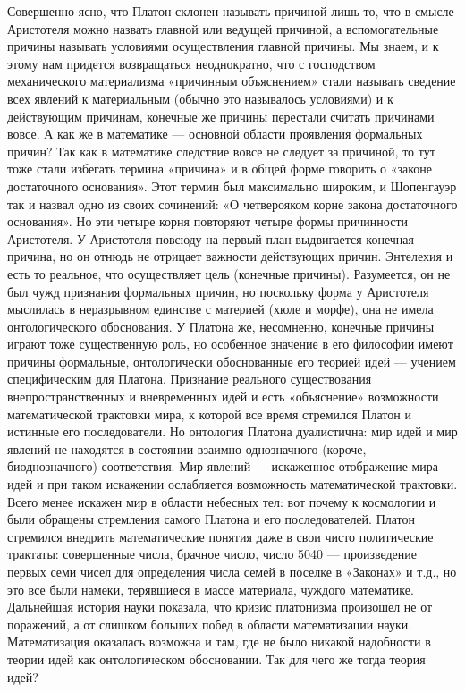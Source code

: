 Совершенно ясно,  что Платон  склонен называть  причиной лишь  то, что
в  смысле  Аристотеля  можно  назвать главной  или  ведущей  причиной,
а  вспомогательные причины  называть  условиями осуществления  главной
причины. Мы знаем,  и к этому нам  придется возвращаться неоднократно,
что с  господством механического материализма  «причинным объяснением»
стали  называть  сведение  всех  явлений к  материальным  (обычно  это
называлось условиями)  и к  действующим причинам, конечные  же причины
перестали считать причинами вовсе. А  как же в математике --- основной
области проявления  формальных причин? Так как  в математике следствие
вовсе  не следует  за причиной,  то  тут тоже  стали избегать  термина
«причина» и в общей форме  говорить о «законе достаточного основания».
Этот термин был максимально широким, и Шопенгауэр так и назвал одно из
своих сочинений: «О четверояком  корне закона достаточного основания».
Но эти четыре  корня повторяют четыре формы  причинности Аристотеля. У
Аристотеля повсюду на первый план  выдвигается конечная причина, но он
отнюдь не  отрицает важности действующих  причин. Энтелехия и  есть то
реальное, что осуществляет цель  (конечные причины). Разумеется, он не
был чужд признания формальных причин,  но поскольку форма у Аристотеля
мыслилась в  неразрывном единстве  с материей (хюле  и морфе),  она не
имела онтологического обоснования. У  Платона же, несомненно, конечные
причины  играют  тоже  существенную  роль,  но  особенное  значение  в
его  философии имеют  причины  формальные, онтологически  обоснованные
его  теорией идей  ---  учением специфическим  для Платона.  Признание
реального  существования  внепространственных  и вневременных  идей  и
есть  «объяснение»   возможности  математической  трактовки   мира,  к
которой все  время стремился Платон  и истинные его  последователи. Но
онтология Платона дуалистична:  мир идей и мир явлений  не находятся в
состоянии взаимно однозначного  (короче, биоднозначного) соответствия.
Мир  явлений  ---  искаженное  отображение   мира  идей  и  при  таком
искажении  ослабляется  возможность  математической  трактовки.  Всего
менее  искажен мир  в области  небесных тел:  вот почему  к космологии
и  были  обращены  стремления  самого Платона  и  его  последователей.
Платон  стремился внедрить  математические понятия  даже в  свои чисто
политические трактаты:  совершенные числа,  брачное число,  число 5040
---  произведение первых  семи  чисел для  определения  числа семей  в
поселке в «Законах» и т.д., но это все были намеки, терявшиеся в массе
материала, чуждого математике. Дальнейшая  история науки показала, что
кризис  платонизма произошел  не от  поражений, а  от слишком  больших
побед в области математизации  науки. Математизация оказалась возможна
и там, где не было никакой надобности в теории идей как онтологическом
обосновании. Так для чего же тогда теория идей?

